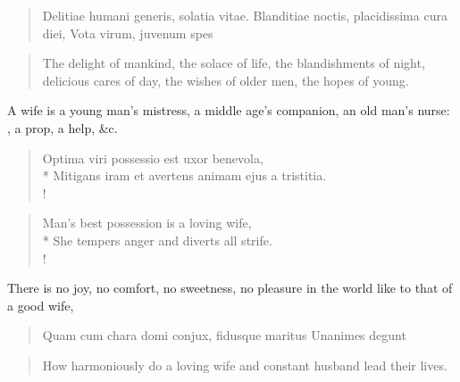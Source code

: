 \begin{latin}
\begin{verse}
Delitiae humani generis, solatia vitae.
Blanditiae noctis, placidissima cura diei,
Vota virum, juvenum spes
\end{verse}
\end{latin}
\translationrule%
\begin{verse}%
The delight of mankind, the solace of life,
the blandishments of night, delicious cares of day,
the wishes of older men, the hopes of young.
\end{verse}%

A wife is a young man's mistress, a middle age's companion, an
old man's nurse: , a prop, a help, \&c.

\begin{latin}
\begin{verse}%
Optima viri possessio est uxor benevola,\\*
Mitigans iram et avertens animam ejus a tristitia.\\!
\end{verse}%
\end{latin}
\translationrule%
\begin{verse}%
Man's best possession is a loving wife,\\*
She tempers anger and diverts all strife.\\!
\end{verse}%
%

There is no joy, no comfort, no sweetness, no pleasure in the world
like to that of a good wife,

\begin{latin}
\begin{verse}
Quam cum chara domi conjux, fidusque maritus
Unanimes degunt
\end{verse}
\end{latin}
\translationrule%
\begin{verse}%
How harmoniously do a loving wife and constant husband
lead their lives.
\end{verse}%

